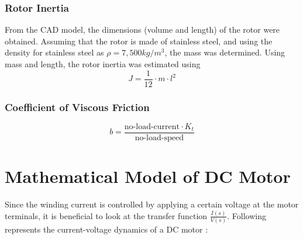 \documentclass{report}
\begin{document}
\subsubsection{Rotor Inertia}
From the CAD model, the dimensions (volume and length) of the rotor were obtained. Assuming that the rotor is made of stainless steel, and using the density for stainless steel as $\rho = 7,500 kg/m^3$, the mass was determined. Using mass and length, the rotor inertia was estimated using
\begin{equation}
J = \frac{1}{12} \cdot m \cdot l^2
\end{equation}

\subsubsection{Coefficient of Viscous Friction}
\begin{equation}
b = \frac{\text{no-load-current} \cdot K_t}{\text{no-load-speed}}
\end{equation}




\section{Mathematical Model of DC Motor}	\label{sec:math_model}

Since the winding current is controlled by applying a certain voltage at the motor terminals, it is beneficial to look at the transfer function $\frac{I(s)}{V(s)}$. Following represents the current-voltage dynamics of a DC motor \cite{motor_control_umich_lecture}:\\
\end{document}
